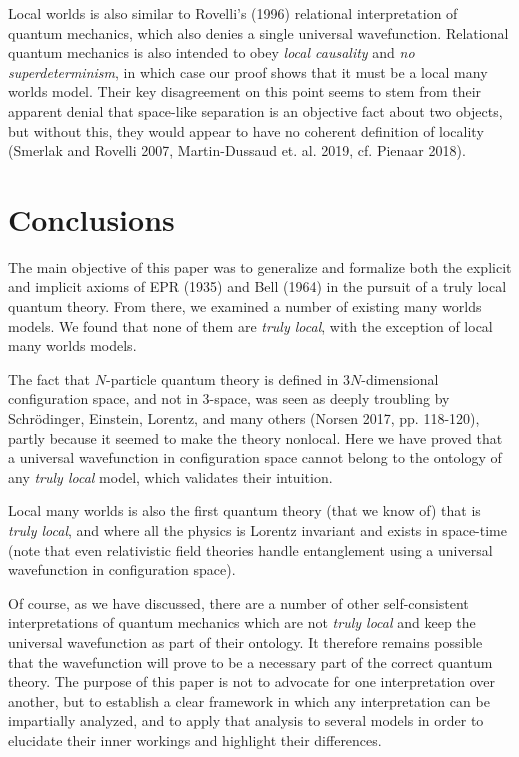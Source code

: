 \documentclass[12pt]{article}
\begin{document}
 Local worlds is also similar to Rovelli's (1996) relational interpretation of quantum mechanics, which also denies a single universal wavefunction.  Relational quantum mechanics is also intended to obey \textit{local causality} and \textit{no superdeterminism}, in which case our proof shows that it must be a local many worlds model. Their key disagreement on this point seems to stem from their apparent denial that space-like separation is an objective fact about two objects, but without this, they would appear to have no coherent definition of locality (Smerlak and Rovelli 2007, Martin-Dussaud et. al. 2019, cf. Pienaar 2018).

\section{Conclusions}  \label{sec:Conc}
The main objective of this paper was to generalize and formalize both the explicit and implicit axioms of EPR (1935) and Bell (1964) in the pursuit of a truly local quantum theory. From there, we examined a number of existing many worlds models. We found that none of them are \textit{truly local}, with the exception of local many worlds models.

The fact that $N$-particle quantum theory is defined in $3N$-dimensional configuration space, and not in 3-space, was seen as deeply troubling by Schr\"{o}dinger, Einstein, Lorentz, and many others (Norsen 2017, pp. 118-120), partly because it seemed to make the theory nonlocal.  Here we have proved that a universal wavefunction in configuration space cannot belong to the ontology of any \textit{truly local} model, which validates their intuition.
  
Local many worlds is also the first quantum theory (that we know of) that is \textit{truly local}, and where all the physics is Lorentz invariant and exists in space-time (note that even relativistic field theories handle entanglement using a universal wavefunction in configuration space).

Of course, as we have discussed, there are a number of other self-consistent interpretations of quantum mechanics which are not \textit{truly local} and keep the universal wavefunction as part of their ontology. It therefore remains possible that the wavefunction will prove to be a necessary part of the correct quantum theory.  The purpose of this paper is not to advocate for one interpretation over another, but to establish a clear framework in which any interpretation can be impartially analyzed, and to apply that analysis to several models in order to elucidate their inner workings and highlight their differences.\newline
\end{document}
